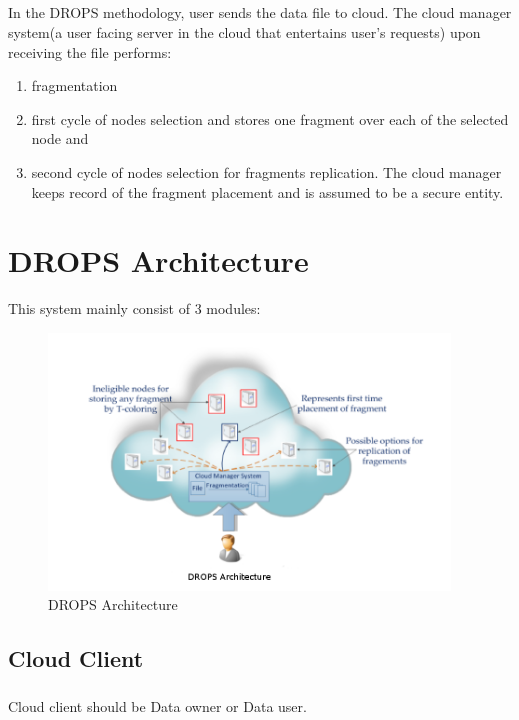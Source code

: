 
\paragraph*{}
\newpage
In the DROPS methodology, user sends the data file to cloud. The cloud manager
system(a user facing server in the cloud that entertains user’s requests) upon receiving the file performs:

\begin{enumerate}
	\item fragmentation
	\item first cycle of nodes selection and stores one fragment over each of the selected node and
	\item second cycle of nodes selection for fragments replication. The cloud manager keeps
	record of the fragment placement and is assumed to be a secure entity.
\end{enumerate}

\chapter{ DROPS Architecture}

This system mainly consist of 3 modules:
\begin{figure}
	\centering
	\includegraphics[width=0.95\textwidth]{./droparchitecture.png}
	\caption{DROPS Architecture}
\end{figure}
\section{Cloud Client}
\paragraph*{} 
Cloud client should be Data owner or Data user.
